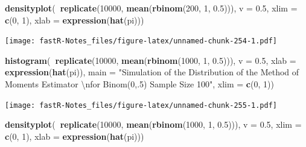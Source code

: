 \documentclass[]{book}
\newenvironment{Shaded}{\begin{snugshade}}{\end{snugshade}}
\newcommand{\KeywordTok}[1]{\textcolor[rgb]{0.13,0.29,0.53}{\textbf{#1}}}
\newcommand{\DataTypeTok}[1]{\textcolor[rgb]{0.13,0.29,0.53}{#1}}
\newcommand{\DecValTok}[1]{\textcolor[rgb]{0.00,0.00,0.81}{#1}}
\newcommand{\FloatTok}[1]{\textcolor[rgb]{0.00,0.00,0.81}{#1}}
\newcommand{\CharTok}[1]{\textcolor[rgb]{0.31,0.60,0.02}{#1}}
\newcommand{\StringTok}[1]{\textcolor[rgb]{0.31,0.60,0.02}{#1}}
\newcommand{\OperatorTok}[1]{\textcolor[rgb]{0.81,0.36,0.00}{\textbf{#1}}}
\newcommand{\NormalTok}[1]{#1}
\theoremstyle{definition}
\theoremstyle{definition}
\theoremstyle{definition}
\theoremstyle{remark}
\begin{document}
\begin{Shaded}
\begin{Highlighting}[]
\KeywordTok{densityplot}\NormalTok{(}\OperatorTok{~}\KeywordTok{replicate}\NormalTok{(}\DecValTok{10000}\NormalTok{, }\KeywordTok{mean}\NormalTok{(}\KeywordTok{rbinom}\NormalTok{(}\DecValTok{200}\NormalTok{, }\DecValTok{1}\NormalTok{, }\FloatTok{0.5}\NormalTok{))), }\DataTypeTok{v =} \FloatTok{0.5}\NormalTok{, }\DataTypeTok{xlim =} \KeywordTok{c}\NormalTok{(}\DecValTok{0}\NormalTok{, }
    \DecValTok{1}\NormalTok{), }\DataTypeTok{xlab =} \KeywordTok{expression}\NormalTok{(}\KeywordTok{hat}\NormalTok{(pi)))}
\end{Highlighting}
\end{Shaded}

\texttt{[image: fastR-Notes\_files/figure-latex/unnamed-chunk-254-1.pdf]}

\begin{Shaded}
\begin{Highlighting}[]
\KeywordTok{histogram}\NormalTok{(}\OperatorTok{~}\KeywordTok{replicate}\NormalTok{(}\DecValTok{10000}\NormalTok{, }\KeywordTok{mean}\NormalTok{(}\KeywordTok{rbinom}\NormalTok{(}\DecValTok{1000}\NormalTok{, }\DecValTok{1}\NormalTok{, }\FloatTok{0.5}\NormalTok{))), }\DataTypeTok{v =} \FloatTok{0.5}\NormalTok{, }\DataTypeTok{xlab =} \KeywordTok{expression}\NormalTok{(}\KeywordTok{hat}\NormalTok{(pi)), }
    \DataTypeTok{main =} \StringTok{"Simulation of the Distribution of the Method of Moments Estimator }\CharTok{\textbackslash{}n}\StringTok{for Binom(0,.5) Sample Size 100"}\NormalTok{, }
    \DataTypeTok{xlim =} \KeywordTok{c}\NormalTok{(}\DecValTok{0}\NormalTok{, }\DecValTok{1}\NormalTok{))}
\end{Highlighting}
\end{Shaded}

\texttt{[image: fastR-Notes\_files/figure-latex/unnamed-chunk-255-1.pdf]}

\begin{Shaded}
\begin{Highlighting}[]
\KeywordTok{densityplot}\NormalTok{(}\OperatorTok{~}\KeywordTok{replicate}\NormalTok{(}\DecValTok{10000}\NormalTok{, }\KeywordTok{mean}\NormalTok{(}\KeywordTok{rbinom}\NormalTok{(}\DecValTok{1000}\NormalTok{, }\DecValTok{1}\NormalTok{, }\FloatTok{0.5}\NormalTok{))), }\DataTypeTok{v =} \FloatTok{0.5}\NormalTok{, }\DataTypeTok{xlim =} \KeywordTok{c}\NormalTok{(}\DecValTok{0}\NormalTok{, }
    \DecValTok{1}\NormalTok{), }\DataTypeTok{xlab =} \KeywordTok{expression}\NormalTok{(}\KeywordTok{hat}\NormalTok{(pi)))}
\end{Highlighting}
\end{Shaded}
\end{document}

